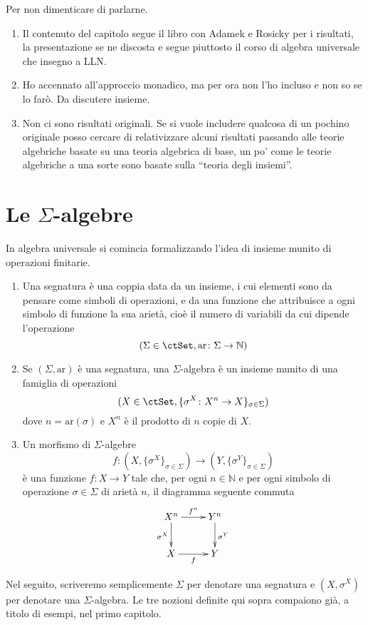 \begin{warning}\label{caveat_monadi_libro_relative}
Per non dimenticare di parlarne.
\begin{enumerate}
\item Il contenuto del capitolo segue il libro con Adamek e Rosicky per i risultati, la presentazione se ne discosta e segue piuttosto il corso di 
algebra universale che insegno a LLN.
\item Ho accennato all'approccio monadico, ma per ora non l'ho incluso e non so se lo farò. Da discutere insieme.
\item Non ci sono risultati originali. Se si vuole includere qualcosa di un pochino originale posso cercare di relativizzare alcuni risultati passando
alle teorie algebriche basate su una teoria algebrica di base, un po' come le teorie algebriche a una sorte sono basate sulla ``teoria degli insiemi''.
\end{enumerate}
\end{warning} 

\section{Le $\Sigma$-algebre}\label{sec_sigma-alg}

In algebra universale si comincia formalizzando l'idea di insieme munito di operazioni finitarie.

\begin{definition}\label{def_sigma_alg}
\hfill
\begin{enumerate}
\item Una segnatura è una coppia data da un insieme, i cui elementi sono da pensare come simboli di operazioni, e da una funzione che
attribuisce a ogni simbolo di funzione la sua arietà, cioè il numero di variabili da cui dipende l'operazione
\[
  (\Sigma \in \ctSet, \mathrm{ar} \colon \Sigma \to \mathbb N) 
\]
\item Se $(\Sigma, \mathrm{ar})$ è una segnatura, una $\Sigma$-algebra è un insieme munito di una famiglia di operazioni
\[
  (X \in \ctSet, \{\sigma^X \colon X^{n} \to X\}_{\sigma \in \Sigma}) 
\]
dove $n = \mathrm{ar}(\sigma)$ e $X^n$ è il prodotto di $n$ copie di $X$.
\item Un morfismo di $\Sigma$-algebre
\[
  f \colon (X,\{\sigma^X\}_{\sigma \in \Sigma}) \to (Y,\{\sigma^Y\}_{\sigma \in \Sigma}) 
\]
è una funzione $f \colon X \to Y$ tale che, per ogni $n \in \mathbb N$ e per ogni simbolo di operazione $\sigma \in \Sigma$ di arietà $n$, 
il diagramma seguente commuta 
\[ 
\xymatrix{ X^{n} \ar[r]^-{f^n} \ar[d]_{\sigma^X} & Y^{n} \ar[d]^{\sigma^Y} \\
X \ar[r]_-{f} & Y
}
\]
\end{enumerate} 
Nel seguito, scriveremo semplicemente $\Sigma$ per denotare una segnatura e $(X,\sigma^X)$ per denotare una $\Sigma$-algebra.
Le tre nozioni definite qui sopra compaiono già, a titolo di esempi, nel primo capitolo.
\end{definition} 

